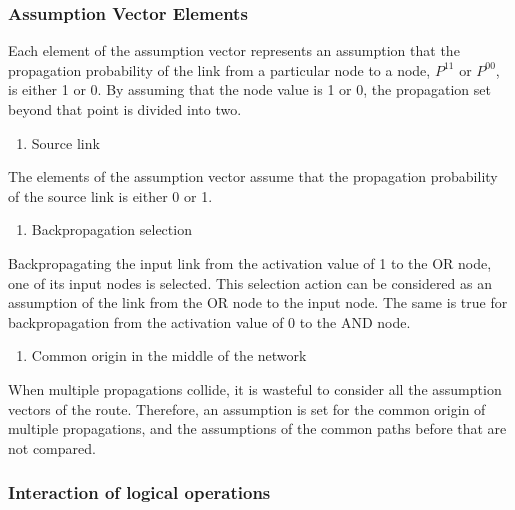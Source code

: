 \documentclass[12pt]{article}
\begin{document}
\subsubsection{Assumption Vector Elements}\label{assumption-vector-elements}

Each element of the assumption vector represents an assumption that the
propagation probability of the link from a particular node to a node,
\(P^{11}\) or \(P^{00}\), is either 1 or 0. By assuming that the node
value is 1 or 0, the propagation set beyond that point is divided into
two.

\begin{enumerate}
\def\labelenumi{\arabic{enumi}.}

\item
  Source link
\end{enumerate}

The elements of the assumption vector assume that the propagation
probability of the source link is either 0 or 1.

\begin{enumerate}
\def\labelenumi{\arabic{enumi}.}
\setcounter{enumi}{1}

\item
  Backpropagation selection
\end{enumerate}

Backpropagating the input link from the activation value of 1 to the OR
node, one of its input nodes is selected. This selection action can be
considered as an assumption of the link from the OR node to the input
node. The same is true for backpropagation from the activation value of
0 to the AND node.

\begin{enumerate}
\def\labelenumi{\arabic{enumi}.}
\setcounter{enumi}{2}

\item
  Common origin in the middle of the network
\end{enumerate}

When multiple propagations collide, it is wasteful to consider all the
assumption vectors of the route. Therefore, an assumption is set for the
common origin of multiple propagations, and the assumptions of the
common paths before that are not compared.

\subsubsection{Interaction of logical
operations}\label{interaction-of-logical-operations}
\end{document}
